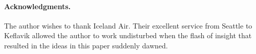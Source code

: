 \paragraph{Acknowledgments.}
The author wishes to thank Iceland Air. Their excellent service from
Seattle to Keflavik allowed the author to work undisturbed when the
flash of insight that resulted in the ideas in this paper suddenly
dawned.
